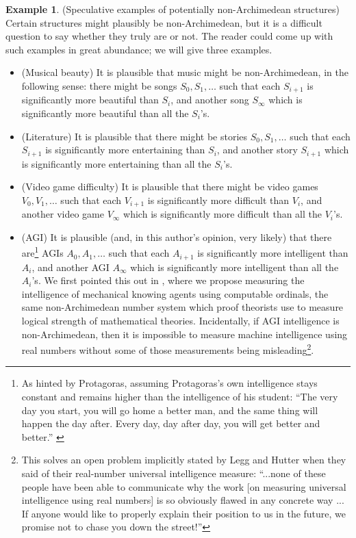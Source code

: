 \documentclass[reqno]{article}
\theoremstyle{definition}
\newtheorem{example}[theorem]{Example}
\begin{document}
\begin{example}
\label{speculativeexamples}
    (Speculative examples of potentially non-Archimedean structures)
    Certain structures might plausibly be non-Archimedean, but it is a difficult
    question to say whether they truly are or not. The reader could come up with
    such examples in great abundance; we will give three examples.
    \begin{itemize}
        \item
        (Musical beauty)
        It is plausible that music might be non-Archimedean, in the following
        sense: there might be songs $S_0,S_1,\ldots$ such that each $S_{i+1}$
        is significantly more beautiful than $S_i$, and another song
        $S_\infty$ which is significantly more beautiful than all the $S_i$'s.
        \item
        (Literature)
        It is plausible that there might be stories $S_0,S_1,\ldots$ such that
        each $S_{i+1}$ is significantly more entertaining than $S_i$, and
        another story $S_{i+1}$ which is significantly more entertaining than
        all the $S_i$'s.
        \item
        (Video game difficulty)
        It is plausible that there might be video games $V_0,V_1,\ldots$ such that
        each $V_{i+1}$ is significantly more difficult than $V_i$, and another
        video game $V_\infty$ which is significantly more difficult than
        all the $V_i$'s.
        \item
        (AGI)
        It is plausible (and, in this author's opinion, very likely) that there
        are\footnote{As hinted by Protagoras, assuming Protagoras's own intelligence
        stays constant and remains higher than the intelligence of his student:
        ``The very day you start, you will go home a better man, and the same thing
        will happen the day after. Every day, day after day, you will get better
        and better.'' \cite{protagoras}} AGIs $A_0,A_1,\ldots$ such that
        each $A_{i+1}$ is significantly more
        intelligent than $A_i$, and another AGI $A_\infty$ which is significantly more
        intelligent than all the $A_i$'s. We first pointed this out in
        \cite{alexander2019}, where we propose measuring the intelligence of mechanical
        knowing agents using computable ordinals, the same non-Archimedean number system
        which proof theorists use to measure logical strength of mathematical
        theories. Incidentally, if AGI intelligence is non-Archimedean, then it is
        impossible to measure machine intelligence using real numbers without some
        of those measurements being misleading\footnote{This solves an open problem
        implicitly stated by Legg and Hutter \cite{legg} when they said of their
        real-number universal intelligence measure: ``...none of these people have
        been able to communicate why the work [on measuring universal intelligence
        using real numbers] is so obviously flawed in any concrete way ...
        If anyone would like to properly explain their position to us in the future,
        we promise not to chase you down the street!''}.
    \end{itemize}
\end{example}
\end{document}
